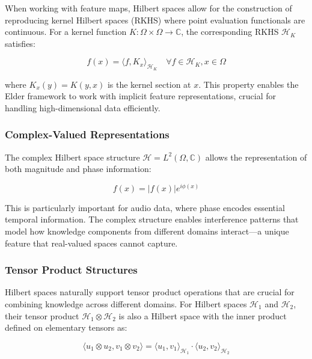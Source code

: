 When working with feature maps, Hilbert spaces allow for the construction of reproducing kernel Hilbert spaces (RKHS) where point evaluation functionals are continuous. For a kernel function $K: \Omega \times \Omega \rightarrow \mathbb{C}$, the corresponding RKHS $\mathcal{H}_K$ satisfies:

\begin{equation}
f(x) = \langle f, K_x \rangle_{\mathcal{H}_K} \quad \forall f \in \mathcal{H}_K, x \in \Omega
\end{equation}

where $K_x(y) = K(y,x)$ is the kernel section at $x$. This property enables the Elder framework to work with implicit feature representations, crucial for handling high-dimensional data efficiently.

\subsubsection{Complex-Valued Representations}

The complex Hilbert space structure $\mathcal{H} = L^2(\Omega, \mathbb{C})$ allows the representation of both magnitude and phase information:

\begin{equation}
f(x) = |f(x)| e^{i\phi(x)}
\end{equation}

This is particularly important for audio data, where phase encodes essential temporal information. The complex structure enables interference patterns that model how knowledge components from different domains interact—a unique feature that real-valued spaces cannot capture.

\subsubsection{Tensor Product Structures}

Hilbert spaces naturally support tensor product operations that are crucial for combining knowledge across different domains. For Hilbert spaces $\mathcal{H}_1$ and $\mathcal{H}_2$, their tensor product $\mathcal{H}_1 \otimes \mathcal{H}_2$ is also a Hilbert space with the inner product defined on elementary tensors as:

\begin{equation}
\langle u_1 \otimes u_2, v_1 \otimes v_2 \rangle = \langle u_1, v_1 \rangle_{\mathcal{H}_1} \cdot \langle u_2, v_2 \rangle_{\mathcal{H}_2}
\end{equation}

